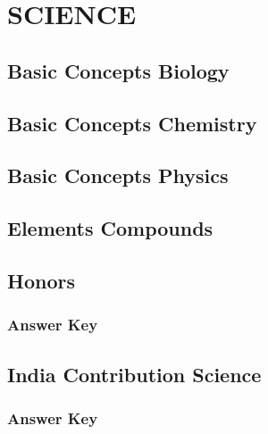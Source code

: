 \documentclass[12pt,a4paper]{book}
\newcounter{totalcounter}
\newcommand{\newsection}[1]{%
  \clearpage
  \section{#1}
}
\begin{document}
\frontmatter

\tableofcontents

\mainmatter

\chapter{SCIENCE}

\setcounter{totalcounter}{1}

\newsection{Basic Concepts Biology}





\setcounter{totalcounter}{1}

\newsection{Basic Concepts Chemistry}





\setcounter{totalcounter}{1}

\newsection{Basic Concepts Physics}





\setcounter{totalcounter}{1}

\newsection{Elements Compounds}





\setcounter{totalcounter}{1}

\newsection{Honors}



\subsection*{Answer Key}



\setcounter{totalcounter}{1}

\newsection{India Contribution Science}



\subsection*{Answer Key}
\end{document}
